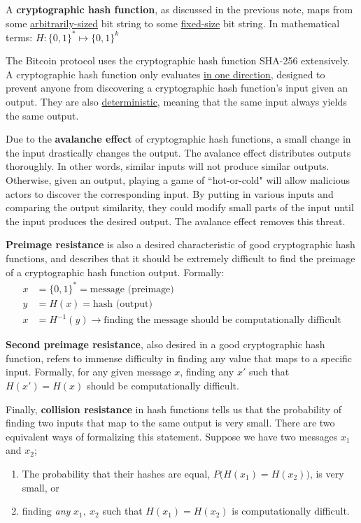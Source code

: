 \documentclass[full.tex]{subfiles}
\begin{document}
   A \textbf{cryptographic hash function}, as discussed in the previous note, maps from some \underline{arbitrarily-sized} bit string to some \underline{fixed-size} bit string. In mathematical terms: $H: \{0,1\}^{*} \mapsto \{0,1\}^{k}$
   
   The Bitcoin protocol uses the cryptographic hash function SHA-256 extensively. A cryptographic hash function only evaluates \underline{in one direction}, designed to prevent anyone from discovering a cryptographic hash function's input given an output. They are also \underline{deterministic}, meaning that the same input always yields the same output.
   
   Due to the \textbf{avalanche effect} of cryptographic hash functions, a small change in the input drastically changes the output. The avalance effect distributes outputs thoroughly. In other words, similar inputs will not produce similar outputs. Otherwise, given an output, playing a game of ``hot-or-cold" will allow malicious actors to discover the corresponding input. By putting in various inputs and comparing the output similarity, they could modify small parts of the input until the input produces the desired output. The avalance effect removes this threat.
   
   \textbf{Preimage resistance} is also a desired characteristic of good cryptographic hash functions, and describes that it should be extremely difficult to find the preimage of a cryptographic hash function output. Formally:
   \begin{align*}
       x &= \{0,1\}^{*} = \text{message (preimage)} \\
       y &= H(x) = \text{hash (output)} \\
       x &= H^{-1}(y) \rightarrow \text{finding the message should be computationally difficult}
   \end{align*}
   
   \textbf{Second preimage resistance}, also desired in a good cryptographic hash function, refers to immense difficulty in finding any value that maps to a specific input. Formally, for any given message $x$, finding any $x'$ such that $H(x') = H(x)$ should be computationally difficult.
   
   Finally, \textbf{collision resistance} in hash functions tells us that the probability of finding two inputs that map to the same output is very small. There are two equivalent ways of formalizing this statement. Suppose we have two messages $x_1$ and $x_2$;
   
   \begin{enumerate}
       \item The probability that their hashes are equal, $P\big(H(x_1) = H(x_2)\big)$, is very small, or
       \item finding \textit{any} $x_1,~x_2$ such that $H(x_1)=H(x_2)$ is computationally difficult.
   \end{enumerate}
   
\end{document}

